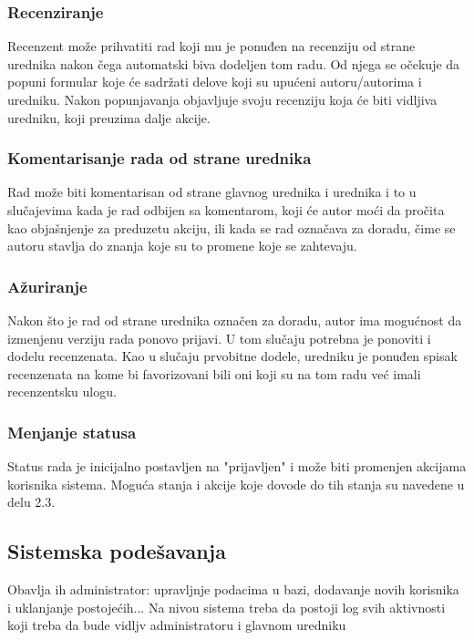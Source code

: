 \documentclass[a4paper]{article}
\begin{document}
\subsubsection{Recenziranje}
Recenzent može prihvatiti rad koji mu je ponuđen na recenziju od strane urednika nakon čega automatski biva dodeljen tom radu. Od njega se očekuje da popuni formular koje će sadržati delove koji su upućeni autoru/autorima i uredniku. Nakon popunjavanja objavljuje svoju recenziju koja će biti vidljiva uredniku, koji preuzima dalje akcije.
\subsubsection{Komentarisanje rada od strane urednika}
Rad može biti komentarisan od strane glavnog urednika i urednika i to u slučajevima kada je rad odbijen sa komentarom, koji će autor moći da pročita kao objašnjenje za preduzetu akciju, ili kada se rad označava za doradu, čime se autoru stavlja do znanja koje su to promene koje se zahtevaju.
\subsubsection{Ažuriranje}
Nakon što je rad od strane urednika označen za doradu, autor ima mogućnost da izmenjenu verziju rada ponovo prijavi. U tom slučaju potrebna je ponoviti i dodelu recenzenata. Kao u slučaju prvobitne dodele, uredniku je ponuđen spisak recenzenata na kome bi favorizovani bili oni koji su na tom radu već imali recenzentsku ulogu.
\subsubsection{Menjanje statusa}
Status rada je inicijalno postavljen na "prijavljen" i može biti promenjen akcijama korisnika sistema. Moguća stanja i akcije koje dovode do tih stanja su navedene u delu 2.3.

    
\subsection{Sistemska podešavanja}
Obavlja ih administrator: upravljnje podacima u bazi, dodavanje novih korisnika i uklanjanje postojećih... Na nivou sistema treba da postoji log svih aktivnosti koji treba da bude vidljv administratoru i glavnom uredniku
\end{document}
